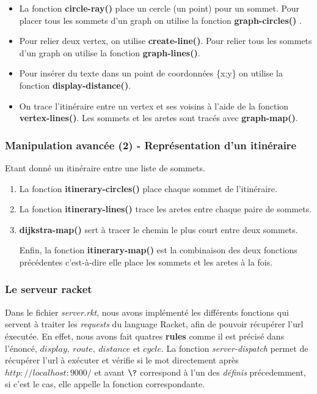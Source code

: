 \documentclass[french]{article}
\begin{document}
\begin{itemize}
    \item La fonction \textbf{circle-ray()} place un cercle (un point) pour un sommet. Pour placer tous les sommets d'un graph on utilise la fonction \textbf{graph-circles()} .  
    \item Pour relier deux vertex, on utilise \textbf{create-line()}. Pour relier tous les sommets d'un graph on utilise la fonction \textbf{graph-lines()}. 
    \item Pour insérer  du texte dans un point de coordonnées \{x;y\} on utilise la fonction \textbf{display-distance()}. 
    \item On trace l'itinéraire entre un vertex et ses voisins à l'aide de la fonction \textbf{vertex-lines()}. Les sommets et les aretes sont tracés avec \textbf{graph-map()}.
\end{itemize}

\subsubsection{Manipulation avancée (2) - Représentation d'un itinéraire}
Etant donné un itinéraire entre une liste de sommets.
\begin{enumerate}
\item La fonction \textbf{itinerary-circles()} place chaque sommet de l'itinéraire. 
\item La fonction \textbf{itinerary-lines()} trace les aretes entre chaque paire de sommets. 
\item \textbf{dijkstra-map()} sert à tracer le chemin le plus court entre deux sommets.

Enfin, la fonction \textbf{itinerary-map()} est la combinaison des deux fonctions précédentes c'est-à-dire elle place les sommets et les aretes à la fois.
\end{enumerate}
\subsubsection{Le serveur racket}
Dans le fichier \textit{server.rkt}, nous avons implémenté les différents fonctions qui servent à traiter les \textit{requests} du language Racket, afin de pouvoir récupérer l'url éxecutée. En effet, nous avons fait quatres \textbf{rules} comme il est précisé dans l'énoncé, $display, ~route, ~distance$ et $cycle$. La fonction \textit{server-dispatch} permet de récupérer l'url à exécuter et vérifie si le mot directement apr\`es $http://localhost:9000/$ et avant $\?$ correspond à l'un des \textit{définis} précedemment, si c'est le cas, elle appelle la fonction correspondante. 
\end{document}
